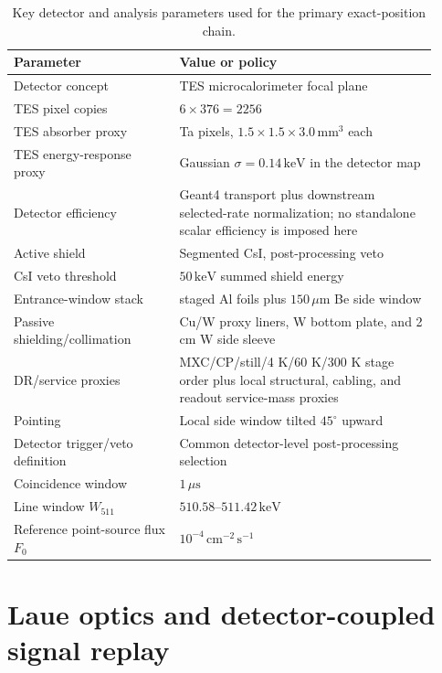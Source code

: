 \documentclass[preprint,12pt]{elsarticle}
\newcommand{\keV}{\,\mathrm{keV}}
\newcommand{\cms}{\,\mathrm{cm^{-2}\,s^{-1}}}
\newcommand{\wii}{W_{511}}
\newcommand{\fzero}{F_{0}}
\begin{document}
\begin{table}[t]
\centering
\caption{Key detector and analysis parameters used for the primary exact-position chain.}
\label{tab:geometry}
\begin{tabular}{p{0.36\linewidth}p{0.56\linewidth}}
\toprule
Parameter & Value or policy \\
\midrule
Detector concept & TES microcalorimeter focal plane \\
TES pixel copies & $6\times376=2256$ \\
TES absorber proxy & Ta pixels, $1.5\times1.5\times3.0\,\mathrm{mm^3}$ each \\
TES energy-response proxy & Gaussian $\sigma=0.14\keV$ in the detector map \\
Detector efficiency & Geant4 transport plus downstream selected-rate normalization; no standalone scalar efficiency is imposed here \\
Active shield & Segmented CsI, post-processing veto \\
CsI veto threshold & $50\keV$ summed shield energy \\
Entrance-window stack & staged Al foils plus $150\,\mu\mathrm{m}$ Be side window \\
Passive shielding/collimation & Cu/W proxy liners, W bottom plate, and 2 cm W side sleeve \\
DR/service proxies & MXC/CP/still/4 K/60 K/300 K stage order plus local structural, cabling, and readout service-mass proxies \\
Pointing & Local side window tilted $45^\circ$ upward \\
Detector trigger/veto definition & Common detector-level post-processing selection \\
Coincidence window & $1\,\mu\mathrm{s}$ \\
Line window $\wii$ & $510.58$--$511.42\keV$ \\
Reference point-source flux $\fzero$ & $10^{-4}\cms$ \\
\bottomrule
\end{tabular}
\end{table}

\clearpage

\section{Laue optics and detector-coupled signal replay}
\label{sec:optics}
\end{document}
